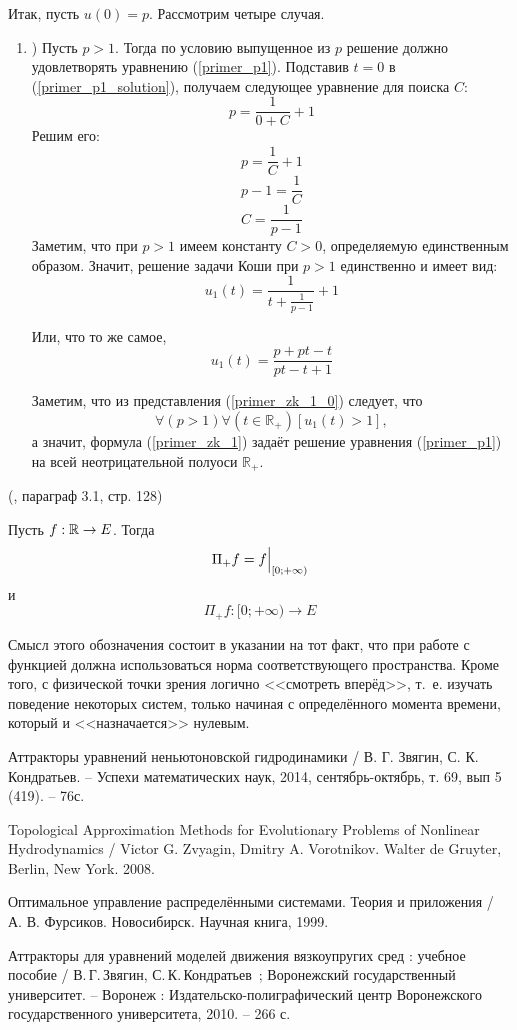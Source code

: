 Итак, пусть $u(0) = p$.
Рассмотрим четыре случая.

\begin{enumerate}

\item)
Пусть $p>1$.
Тогда по условию выпущенное из $p$ решение должно удовлетворять уравнению (\ref{primer_p1}).
Подставив $t=0$ в (\ref{primer_p1_solution}), получаем следующее уравнение для поиска $C$:
$$
	p=\frac{1}{0+C}+1
$$
Решим его:
$$
	p=\frac{1}{C}+1
$$
$$
	p-1=\frac{1}{C}
$$
$$
	C=\frac{1}{p-1}
$$
Заметим, что при $p>1$ имеем константу $C>0$, определяемую единственным образом.
Значит, решение задачи Коши при $p>1$ единственно и имеет вид:
\begin{equation}\label{primer_zk_1_0}
	u_1(t)=\frac{1}{t+\frac{1}{p-1}}+1
\end{equation}

Или, что то же самое,
\begin{equation}\label{primer_zk_1}
	u_1(t)=\frac{p+pt-t}{pt-t+1}
\end{equation}

Заметим, что из представления (\ref{primer_zk_1_0}) следует, что
$$
	\forall(p>1)\forall\left(t \in \mathbb{R}_+\right)\left[u_1(t) > 1\right],
$$
а значит, формула (\ref{primer_zk_1}) задаёт решение уравнения (\ref{primer_p1}) на всей неотрицательной полуоси $\mathbb{R}_+$.

\end{enumerate}


\opred (\cite{Zelenaya}, параграф 3.1, стр. 128)

Пусть $f:\mathbb{R}\to E$.
Тогда
$$
	\Pi_+f = \Bigl. f \Bigr|_{[0;+\infty)}
$$
и
$$
	\Pi_+f:[0; +\infty) \to E
$$

Смысл этого обозначения состоит в указании на тот факт, что при работе с функцией должна использоваться норма соответствующего пространства.
Кроме того, с физической точки зрения логично <<смотреть вперёд>>, т.~е. изучать поведение некоторых систем, только начиная с определённого момента времени, который и <<назначается>> нулевым.

\begin{thebibliography}{99}

 Аттракторы уравнений неньютоновской гидродинамики / В. Г. Звягин, С. К. Кондратьев. – Успехи математических наук, 2014, сентябрь-октябрь, т. 69, вып 5 (419). – 76с.

 Topological Approximation Methods for Evolutionary Problems of Nonlinear Hydrodynamics / Victor G. Zvyagin, Dmitry A. Vorotnikov. Walter de Gruyter, Berlin, New York. 2008.

 Оптимальное управление распределёнными системами. Теория и приложения / А. В. Фурсиков. Новосибирск. Научная книга, 1999.

 Аттракторы для уравнений моделей движения вязкоупругих сред : учебное пособие / В.\,Г.\,Звягин, С.\,К.\,Кондратьев~; Воронежский государственный университет. -- Воронеж : Издательско-полиграфический центр Воронежского государственного университета, 2010. -- 266 с.


\end{thebibliography}



